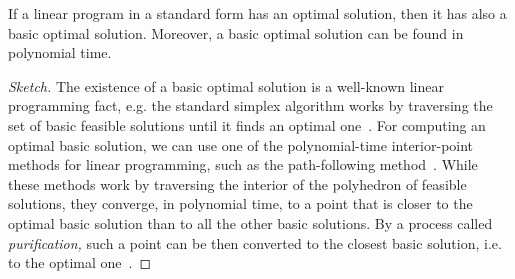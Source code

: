 \begin{lemma}
\label{5-lem:basic-sol}
If a linear program in a standard form has an optimal solution, then it has also a basic optimal solution. Moreover, a basic optimal solution can be found in polynomial time.
\end{lemma}
\begin{proof}[Sketch]
The existence of a basic optimal solution is a well-known linear programming fact, e.g. the standard simplex algorithm works by traversing the set of basic feasible solutions until it finds an optimal one~\cite{Matousek:2007}. For computing an optimal basic solution, we can use one of the polynomial-time interior-point methods for linear programming, such as the path-following method~\cite{Karmarkar:1984,Gonzaga:1992}. While these methods work by traversing the interior of the polyhedron of feasible solutions, they converge, in polynomial time, to a point that is closer to the optimal basic solution than to all the other basic solutions. By a process called \emph{purification,} such a point can be then converted to the closest basic solution, i.e. to the optimal one~\cite{Gonzaga:1992}.
\end{proof}







